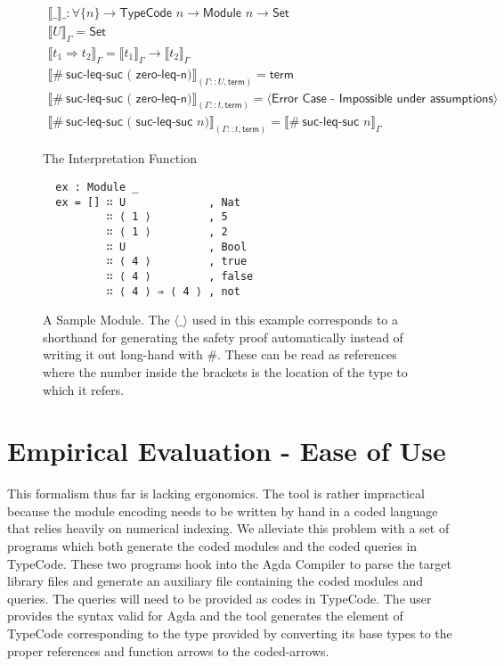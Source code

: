 \documentclass[acmsmall,review,authorversion]{acmart}
\newcommand{\type}[1]{\textsf{#1}}
\newcommand{\Set}{\type{Set}}
\newcommand{\Interp}[1]{\llbracket #1 \rrbracket}
\newcommand{\?}{\stackrel{?}{\approx}}
\begin{document}
  \begin{figure}
    \centering
  $$
  \begin{array}{l}
    \Interp{\_}\_ : \forall \{ n \} \rightarrow \textsf{TypeCode } n \rightarrow
    \textsf{Module } n \rightarrow \Set\\
    \Interp{ U }_\Gamma = \Set\\
    \Interp{ t_1 \Rightarrow t_2 }_\Gamma = \Interp{t_1}_\Gamma \rightarrow \Interp{t_2}_\Gamma\\
    \Interp{ \#\ \textsf{suc-leq-suc ( zero-leq-n)}}_{(\Gamma :: U ,
    \textsf{term})} = \textsf{term}\\
    \Interp{ \#\ \textsf{suc-leq-suc ( zero-leq-n)}}_{(\Gamma :: t ,
    \textsf{term})} = \langle\textsf{Error Case - Impossible under assumptions}\rangle\\
    \Interp{ \#\ \textsf{suc-leq-suc ( suc-leq-suc } n )}_{(\Gamma :: t ,
    \textsf{term})} = \Interp{ \#\ \textsf{suc-leq-suc } n }_\Gamma
  \end{array}
  $$
  \caption{The Interpretation Function}
  \label{fig:interp}
\end{figure}

\begin{figure}
  \centering
\begin{verbatim}
  ex : Module _
  ex = [] ∷ U             , Nat
          ∷ ⟨ 1 ⟩         , 5
          ∷ ⟨ 1 ⟩         , 2
          ∷ U             , Bool
          ∷ ⟨ 4 ⟩         , true
          ∷ ⟨ 4 ⟩         , false
          ∷ ⟨ 4 ⟩ ⇒ ⟨ 4 ⟩ , not
\end{verbatim}
  \caption{A Sample Module.
  The $\langle\_\rangle$ used in this example corresponds to a shorthand for
  generating the safety proof automatically instead of writing it out long-hand
  with $\#$. These can be read as references where the number inside the
  brackets is the location of the type to which it refers.}
  \label{fig:ex}
\end{figure}


\section{Empirical Evaluation - Ease of Use}

This formalism thus far is lacking ergonomics. The tool is rather impractical
because the module encoding needs to be written by hand in a coded language that
relies heavily on numerical indexing. We alleviate this problem with a set of
programs which both generate the coded modules and the coded queries in
\textsf{TypeCode}. These two programs hook into the Agda Compiler to parse the
target library files and generate an auxiliary file containing the coded modules
and queries. The queries will need to be provided as codes in \textsf{TypeCode}.
The user provides the syntax valid for Agda and the tool generates the element
of \textsf{TypeCode} corresponding to the type provided by converting its base
types to the proper references and function arrows to the coded-arrows.
\end{document}
